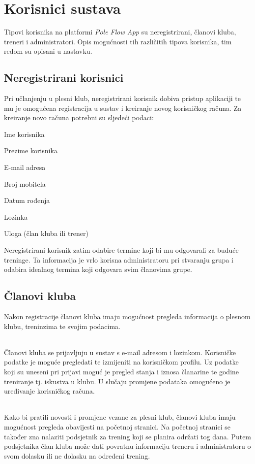 \documentclass[times, utf8, zavrsni]{fer}
\newenvironment{packed_item}{
	\begin{itemize}
		\setlength{\itemsep}{0pt}
		\setlength{\parskip}{0pt}
		\setlength{\parsep}{0pt}
	}{\end{itemize}}
\begin{document}
    \section{Korisnici sustava}
    
		Tipovi korisnika na platformi \textit{Pole Flow App} su neregistrirani, članovi kluba, treneri i administratori. Opis mogućnosti tih različitih tipova korisnika, tim redom su opisani u nastavku.
		
		\subsection{Neregistrirani korisnici}
		Pri učlanjenju u plesni klub, neregistrirani korisnik dobiva pristup aplikaciji te mu je omogućena registracija u sustav i kreiranje novog korisničkog računa. Za kreiranje novo računa potrebni su sljedeći podaci:
		 \begin{packed_item}
		    \item Ime korisnika
		    \item Prezime korisnika
		    \item E-mail adresa
		    \item Broj mobitela
		    \item Datum rođenja
		    \item Lozinka
		    \item Uloga (član kluba ili trener)
	    \end{packed_item}
	
	    Neregistrirani korisnik zatim odabire termine koji bi mu odgovarali za buduće treninge. Ta informacija je vrlo korisna administratoru pri stvaranju grupa i odabira idealnog termina koji odgovara svim članovima grupe.
		
		
		\subsection{Članovi kluba}
		Nakon registracije članovi kluba imaju mogućnost pregleda informacija o plesnom klubu, treninzima te svojim podacima.  
		
		\\Članovi kluba se prijavljuju u sustav s e-mail adresom i lozinkom. Korisničke podatke je moguće pregledati te izmijeniti na korisničkom profilu. Uz podatke koji su uneseni pri prijavi moguć je pregled stanja i iznosa članarine te godine treniranje tj. iskustva u klubu. U slučaju promjene podataka omogućeno je uređivanje korisničkog računa. 
		
		\\Kako bi pratili novosti i promjene vezane za plesni klub, članovi kluba imaju mogućnost pregleda obavijesti na početnoj stranici. Na početnoj stranici se također zna nalaziti podsjetnik za trening koji se planira održati tog dana. Putem podsjetnika član kluba može dati povratnu informaciju treneru i administratoru o svom dolasku ili ne dolasku na određeni trening. 
		
\end{document}
